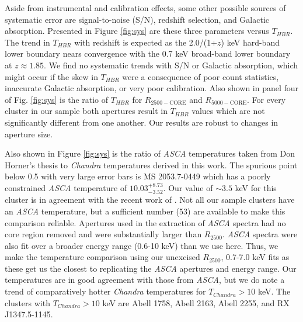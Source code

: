 \documentclass{emulateapj}
\begin{document}

Aside from instrumental and calibration effects, some other possible
sources of systematic error are signal-to-noise (S/N), redshift
selection, and Galactic absorption. Presented in Figure \ref{fig:sys}
are these three parameters versus $T_{HBR}$. The trend in $T_{HBR}$ with redshift
is expected as the 2.0/(1+$z$) keV hard-band lower boundary nears
convergence with the 0.7 keV broad-band lower boundary at
$z \approx 1.85$. We find no systematic trends with S/N or Galactic
absorption, which might occur if the skew in $T_{HBR}$ were a consequence of
poor count statistics, inaccurate Galactic absorption, or very poor
calibration. Also shown in panel four of Fig. \ref{fig:sys} is the
ratio of $T_{HBR}$ for $R_{2500-\mathrm{CORE}}$ and
$R_{5000-\mathrm{CORE}}$. For every cluster in our sample both apertures
result in $T_{HBR}$ values which are not significantly different from
one another. Our results are robust to changes in aperture size.

Also shown in Figure \ref{fig:sys} is the ratio of {\it ASCA}
temperatures taken from Don Horner's thesis to {\it Chandra}
temperatures derived in this work. The spurious point below 0.5 with
very large error bars is MS 2053.7-0449 which has a poorly
constrained {\it ASCA} temperature of $10.03^{+8.73}_{-3.52}$. Our value of
$\sim 3.5$ keV for this cluster is in agreement with the recent work of
\cite{2007astro.ph..3156M}. Not all our sample clusters have an {\it ASCA}
temperature, but a sufficient number (53) are available to make this
comparison reliable. Apertures used in the extraction of {\it ASCA} spectra
had no core region removed and were substantially larger than
$R_{2500}$. {\it ASCA} spectra were also fit over a broader energy range
(0.6-10 keV) than we use here. Thus, we make the temperature
comparison using our unexcised $R_{2500}$, 0.7-7.0 keV fits as
these get us the closest to replicating the {\it ASCA} apertures and energy
range. Our temperatures are in good agreement with those from {\it ASCA},
but we do note a trend of comparatively hotter {\it Chandra} temperatures for
$T_{Chandra} > 10$ keV. The clusters with $T_{Chandra} > 10$ keV are
Abell 1758, Abell 2163, Abell 2255, and RX J1347.5-1145.
\end{document}
